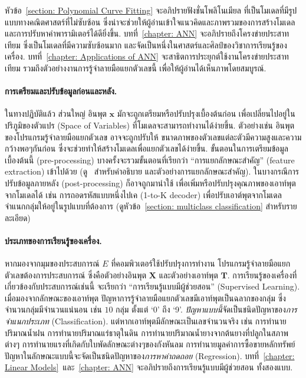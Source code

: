 หัวข้อ~\ref{section: Polynomial Curve Fitting} จะอภิปรายฟังชั่นโพลิโนเมียล ที่เป็นโมเดลที่มีรูปแบบทางคณิตศาสตร์ที่ไม่ซับซ้อน %
ซึ่งน่าจะช่วยให้ผู้อ่านเข้าใจแนวคิดและภาพรวมของการสร้างโมเดลและการปรับหาค่าพารามิเตอร์ได้ดียิ่งขึ้น.
%
บทที่~\ref{chapter: ANN} จะอภิปรายถึงโครงข่ายประสาทเทียม ซึ่งเป็นโมเดลที่มีความซับซ้อนมาก และจัดเป็นหนึ่งในศาสตร์และศิลป์ของวิชาการเรียนรู้ของเครื่อง.
บทที่~\ref{chapter: Applications of ANN} จะสาธิตการประยุกต์ใช้งานโครงข่ายประสาทเทียม
รวมถึงตัวอย่างงานการรู้จำลายมือแยกตัวเลขนี้ เพื่อให้ผู้อ่านได้เห็นภาพโดยสมบูรณ์.

\paragraph{การเตรียมและปรับข้อมูลก่อนและหลัง.} 
ในทางปฏิบัติแล้ว ส่วนใหญ่ อินพุต $\mathbf{x}$ มักจะถูกเตรียมหรือปรับปรุงเบื้องต้นก่อน 
เพื่อเปลี่ยนไปอยู่ในปริภูมิของตัวแปร
(Space of Variables) 
ที่โมเดลจะสามารถทำงานได้ง่ายขึ้น.
ตัวอย่างเช่น อินพุตของโปรแกรมรู้จำลายมือแยกตัวเลข อาจจะถูกปรับให้ ขนาดภาพของตัวเลขแต่ละตัวมีความสูงและความกว้างพอๆกันก่อน 
ซึ่งจะช่วยทำให้สร้างโมเดลเพื่อแยกตัวเลขได้ง่ายขึ้น.
ขั้นตอนในการเตรียมข้อมูลเบื้องต้นนี้ (pre-processing) บางครั้งจะรวมขั้นตอนที่เรียกว่า ``การแยกลักษณะสำคัญ'' (feature extraction) เข้าไปด้วย (ดู~\cite{KatanyukulPonsawat2016a} สำหรับคำอธิบาย และตัวอย่างการแยกลักษณะสำคัญ).
ในบางกรณีการปรับข้อมูลภายหลัง (post-processing) ก็อาจถูกมานำใช้ เพื่อเพิ่มหรือปรับปรุงคุณภาพของเอาท์พุตจากโมเดลได้ เช่น การถอดรหัสแบบหนึ่งไปเค
(1-to-K decoder)
เพื่อปรับเอาต์พุตจากโมเดลจำแนกกลุ่มให้อยู่ในรูปแบบที่ต้องการ (ดูหัวข้อ~\ref{section: multiclass classification} สำหรับรายละเอียด)

\paragraph{ประเภทของการเรียนรู้ของเครื่อง.} 
หากมองจากมุมของประสบการณ์ $E$ ที่คอมพิวเตอร์ใช้ปรับปรุงการทำงาน โปรแกรมรู้จำลายมือแยกตัวเลขต้องการประสบการณ์ ซึ่งคือตัวอย่างอินพุต $\mathbf{X}$ และตัวอย่างเอาท์พุต $\mathbf{T}$.
การเรียนรู้ของเครื่องที่เกี่ยวข้องกับประสบการณ์เช่นนี้ จะเรียกว่า ``การเรียนรู้แบบมีผู้ช่วยสอน'' (Supervised Learning).
เมื่อมองจากลักษณะของเอาท์พุต ปัญหาการรู้จำลายมือแยกตัวเลขมีเอาท์พุตเป็นฉลากของกลุ่ม ซึ่งจำนวนกลุ่มมีจำนวนแน่นอน เช่น $10$ กลุ่ม ตั้งแต่ `0' ถึง `9'.
\textit{ปัญหาแบบนี้}จัดเป็นชนิดปัญหาของ\textit{การจำแนกประเภท} (Classification).
แต่หากเอาท์พุตมีลักษณะเป็นเลขจำนวนจริง เช่น การทำนายปริมาณน้ำฝน การทำนายปริมาณแร่ธาตุในดิน การทำนายปริมาณน้ำยางจากต้นยางที่ปลูกในสภาพต่างๆ การทำนายแรงที่เกิดกับใบพัดลักษณะต่างๆของกังหันลม การทำนายมูลค่าการซื้อขายหลักทรัพย์
ปัญหาในลักษณะแบบนี้จะจัดเป็นชนิดปัญหาของ\textit{การหาค่าถดถอย} (Regression).
บทที่~\ref{chapter: Linear Models}~และ~\ref{chapter: ANN} จะอภิปรายถึงการเรียนรู้แบบมีผู้ช่วยสอน ทั้งสองแบบ.

